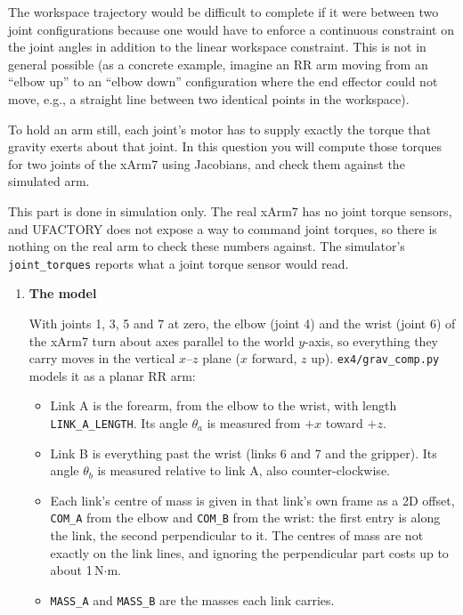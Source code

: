 \documentclass{16384_doc}
\begin{document}
\begin{questions}
    The workspace trajectory would be difficult to complete if it were between
    two joint configurations because one would have to enforce a continuous
    constraint on the joint angles in addition to the linear workspace
    constraint. This is not in general possible (as a concrete example, imagine
    an RR arm moving from an ``elbow up'' to an ``elbow down'' configuration
    where the end effector could not move, e.g., a straight line between two
    identical points in the workspace).


    To hold an arm still, each joint's motor has to supply exactly the torque
    that gravity exerts about that joint. In this question you will compute
    those torques for two joints of the xArm7 using Jacobians, and check them
    against the simulated arm.

    This part is done in simulation only. The real xArm7 has no joint torque
    sensors, and UFACTORY does not expose a way to command joint torques, so
    there is nothing on the real arm to check these numbers against. The
    simulator's \verb!joint_torques! reports what a joint torque sensor would
    read.

    \begin{enumerate} [label=\alph*.]

        \item \textbf{The model}

        With joints 1, 3, 5 and 7 at zero, the elbow (joint 4) and the wrist
        (joint 6) of the xArm7 turn about axes parallel to the world $y$-axis, so
        everything they carry moves in the vertical $x$--$z$ plane ($x$ forward,
        $z$ up). \verb!ex4/grav_comp.py! models it as a planar RR arm:

        \begin{itemize}
            \item Link A is the forearm, from the elbow to the wrist, with length
                \verb!LINK_A_LENGTH!. Its angle $\theta_a$ is measured from $+x$
                toward $+z$.
            \item Link B is everything past the wrist (links 6 and 7 and the
                gripper). Its angle $\theta_b$ is measured relative to link A,
                also counter-clockwise.
            \item Each link's centre of mass is given in that link's own frame
                as a 2D offset, \verb!COM_A! from the elbow and \verb!COM_B! from
                the wrist: the first entry is along the link, the second
                perpendicular to it. The centres of mass are not exactly on the
                link lines, and ignoring the perpendicular part costs up to
                about 1\,N$\cdot$m.
            \item \verb!MASS_A! and \verb!MASS_B! are the masses each link
                carries.
        \end{itemize}


\end{enumerate}
\end{questions}
\end{document}
